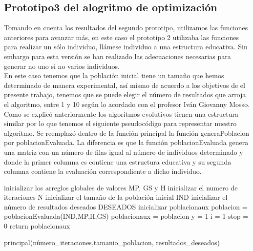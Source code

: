 \subsection{Prototipo3 del alogritmo de optimización}

Tomando en cuenta los resultados del segundo prototipo, utilizamos las funciones anteriores para avanzar más, en este caso el prototipo 2 utilizaba las funciones para realizar un sólo individuo, llámese individuo a una estructura educativa. Sin embargo para esta versión se han realizado las adecuaciones necesarias para generar no uno si no varios individuos.\\

En este caso tenemos que la población inicial tiene un tamaño que hemos determinado de manera experimental, así mismo de acuerdo a los objetivos de el presente trabajo, tenemos que se puede elegir el número de resultados que arroja el algoritmo, entre 1 y 10 según lo acordado con el profesor Iván Giovanny Mosso.\\

Como se explicó anteriormente los algoritmos evolutivos tienen una estructura similar por lo que tenemos el siguiente pseudocódigo para representar nuestro algoritmo. Se reemplazó dentro de la función principal la función generaPoblacion por poblacionEvaluada. La diferencia es que la función poblacionEvaluada genera una matriz con un número de filas igual al número de individuos determinado y donde la primer columna es contiene una estructura educativa y su segunda columna contiene la evaluación correspondiente a dicho individuo.\\

\begin{algorithm}[H]
	\DontPrintSemicolon
	\SetAlgoLined
	inicializar los arreglos globales de valores MP, GS y H\;
	inicializar el numero de iteraciones N\;
	inicializar el tamaño de la población inicial IND\;
	inicializar el número de resultados deseados DESEADOS\;
	inicializar poblacionaux\;
	poblacion = poblacionEvaluada(IND,MP,H,GS)\;
	poblacionaux = poblacion\;
	y = 1\;
	i = 1\;
	stop = 0\;
	return poblacionaux\;
	\caption{principal(número_iteraciones,tamanio_poblacion, resultados_deseados)}
\end{algorithm}

